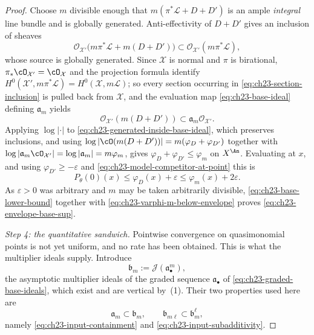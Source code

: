 \begin{proof}
Choose $m$ divisible enough that $m(\pi^*\mathcal L+D+D')$ is an ample
\emph{integral} line bundle and is globally generated.  Anti-effectivity of
$D+D'$ gives an inclusion of sheaves
\begin{equation}\label{eq:ch23-section-inclusion}
 \mathcal O_{\mathcal X'}
       \bigl(m\pi^*\mathcal L+m(D+D')\bigr)
 \subset
 \mathcal O_{\mathcal X'}(m\pi^*\mathcal L),
\end{equation}
whose source is globally generated.  Since $\mathcal X$ is normal and
$\pi$ is birational, $\pi_*\cO_{\mathcal X'}=\cO_{\mathcal X}$ and the
projection formula identify
$H^0(\mathcal X',m\pi^*\mathcal L)=H^0(\mathcal X,m\mathcal L)$; so every
section occurring in \eqref{eq:ch23-section-inclusion} is pulled back from
$\mathcal X$, and the evaluation map \eqref{eq:ch23-base-ideal} defining
$\mathfrak a_m$ yields
\begin{equation}\label{eq:ch23-generated-inside-base-ideal}
       \mathcal O_{\mathcal X'}(m(D+D'))
       \subset\mathfrak a_m\mathcal O_{\mathcal X'} .
\end{equation}
Applying $\log|\cdot|$ to
\eqref{eq:ch23-generated-inside-base-ideal}, which preserves inclusions, and
using $\log|\cO(m(D+D'))|=m(\varphi_D+\varphi_{D'})$ together with
$\log|\mathfrak a_m\cO_{\mathcal X'}|=\log|\mathfrak a_m|=m\varphi_m$,
gives $\varphi_D+\varphi_{D'}\leq\varphi_m$ on $X^{\An}$.  Evaluating at
$x$, and using $\varphi_{D'}\geq-\varepsilon$ and
\eqref{eq:ch23-model-competitor-at-point} this is
\begin{equation}\label{eq:ch23-base-lower-bound}
 P_\theta(0)(x)
 \leq\varphi_D(x)+\varepsilon
 \leq\varphi_m(x)+2\varepsilon.
\end{equation}
As $\varepsilon>0$ was arbitrary and $m$ may be taken arbitrarily
divisible, \eqref{eq:ch23-base-lower-bound} together with
\eqref{eq:ch23-varphi-m-below-envelope} proves
\eqref{eq:ch23-envelope-base-sup}.

\emph{Step 4: the quantitative sandwich.}
Pointwise convergence on quasimonomial points is not yet uniform, and no
rate has been obtained.  This is what the multiplier ideals supply.
Introduce
\begin{equation}\label{eq:ch23-asymptotic-multiplier}
                         \mathfrak b_m
                         :=\mathcal J(\mathfrak a_\bullet^m),
\end{equation}
the asymptotic multiplier ideals of the graded sequence
$\mathfrak a_\bullet$ of \eqref{eq:ch23-graded-base-ideals}, which exist
and are vertical by \,(1).  Their
two properties used here are
\begin{equation}\label{eq:ch23-multiplier-properties}
 \mathfrak a_m\subset\mathfrak b_m,
 \qquad
 \mathfrak b_{m\ell}\subset\mathfrak b_m^\ell,
\end{equation}
namely \eqref{eq:ch23-input-containment} and
\eqref{eq:ch23-input-subadditivity}.


\end{proof}
